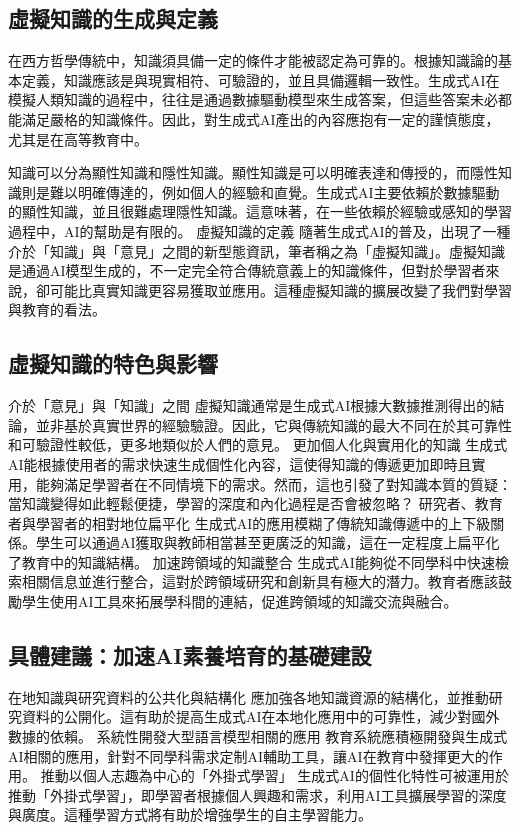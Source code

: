 \subsection{虛擬知識的生成與定義}
在西方哲學傳統中，知識須具備一定的條件才能被認定為可靠的。根據知識論的基本定義，知識應該是與現實相符、可驗證的，並且具備邏輯一致性。生成式AI在模擬人類知識的過程中，往往是通過數據驅動模型來生成答案，但這些答案未必都能滿足嚴格的知識條件。因此，對生成式AI產出的內容應抱有一定的謹慎態度，尤其是在高等教育中。
\par 知識可以分為顯性知識和隱性知識。顯性知識是可以明確表達和傳授的，而隱性知識則是難以明確傳達的，例如個人的經驗和直覺。生成式AI主要依賴於數據驅動的顯性知識，並且很難處理隱性知識。這意味著，在一些依賴於經驗或感知的學習過程中，AI的幫助是有限的。
虛擬知識的定義
隨著生成式AI的普及，出現了一種介於「知識」與「意見」之間的新型態資訊，筆者稱之為「虛擬知識」。虛擬知識是通過AI模型生成的，不一定完全符合傳統意義上的知識條件，但對於學習者來說，卻可能比真實知識更容易獲取並應用。這種虛擬知識的擴展改變了我們對學習與教育的看法。
\subsection{虛擬知識的特色與影響}
介於「意見」與「知識」之間
虛擬知識通常是生成式AI根據大數據推測得出的結論，並非基於真實世界的經驗驗證。因此，它與傳統知識的最大不同在於其可靠性和可驗證性較低，更多地類似於人們的意見。
更加個人化與實用化的知識
生成式AI能根據使用者的需求快速生成個性化內容，這使得知識的傳遞更加即時且實用，能夠滿足學習者在不同情境下的需求。然而，這也引發了對知識本質的質疑：當知識變得如此輕鬆便捷，學習的深度和內化過程是否會被忽略？
研究者、教育者與學習者的相對地位扁平化
生成式AI的應用模糊了傳統知識傳遞中的上下級關係。學生可以通過AI獲取與教師相當甚至更廣泛的知識，這在一定程度上扁平化了教育中的知識結構。
加速跨領域的知識整合
生成式AI能夠從不同學科中快速檢索相關信息並進行整合，這對於跨領域研究和創新具有極大的潛力。教育者應該鼓勵學生使用AI工具來拓展學科間的連結，促進跨領域的知識交流與融合。
\subsection{具體建議：加速AI素養培育的基礎建設}
在地知識與研究資料的公共化與結構化
應加強各地知識資源的結構化，並推動研究資料的公開化。這有助於提高生成式AI在本地化應用中的可靠性，減少對國外數據的依賴。
系統性開發大型語言模型相關的應用
教育系統應積極開發與生成式AI相關的應用，針對不同學科需求定制AI輔助工具，讓AI在教育中發揮更大的作用。
推動以個人志趣為中心的「外掛式學習」
生成式AI的個性化特性可被運用於推動「外掛式學習」，即學習者根據個人興趣和需求，利用AI工具擴展學習的深度與廣度。這種學習方式將有助於增強學生的自主學習能力。
